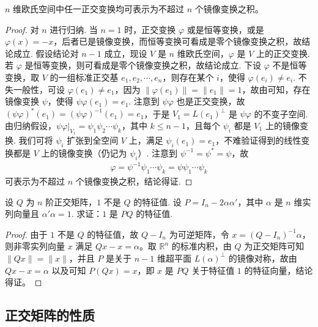 \documentclass[../../main.tex]{subfiles}
\begin{document}
\begin{proposition}\label{proposition:例9.43}
\(n\) 维欧氏空间中任一正交变换均可表示为不超过 \(n\) 个镜像变换之积。
\end{proposition}
\begin{proof}
对 \(n\) 进行归纳. 当 \(n = 1\) 时，正交变换 \(\varphi\) 或是恒等变换，或是 \(\varphi(x) = -x\)，后者已是镜像变换，而恒等变换可看成是零个镜像变换之积，故结论成立. 假设结论对 \(n - 1\) 成立，现设 \(V\) 是 \(n\) 维欧氏空间，\(\varphi\) 是 \(V\) 上的正交变换. 若 \(\varphi\) 是恒等变换，则可看成是零个镜像变换之积，故结论成立. 下设 \(\varphi\) 不是恒等变换，取 \(V\) 的一组标准正交基 \(e_1,e_2,\cdots,e_n\)，则存在某个 \(i\)，使得 \(\varphi(e_i) \neq e_i\). 不失一般性，可设 \(\varphi(e_1) \neq e_1\)，因为 \(\|\varphi(e_1)\| = \|e_1\| = 1\)，故由可知，存在镜像变换 \(\psi\)，使得 \(\psi\varphi(e_1) = e_1\). 注意到 \(\psi\varphi\) 也是正交变换，故 \((\psi\varphi)^*(e_1) = (\psi\varphi)^{-1}(e_1) = e_1\)，于是 \(V_1 = L(e_1)^{\perp}\) 是 \(\psi\varphi\) 的不变子空间. 由归纳假设，\(\psi\varphi|_{V_1} = \psi_1\psi_2\cdots\psi_k\)，其中 \(k \leq n - 1\)，且每个 \(\psi_i\) 都是 \(V_1\) 上的镜像变换. 我们可将 \(\psi_i\) 扩张到全空间 \(V\) 上，满足 \(\psi_i(e_1) = e_1\)，不难验证得到的线性变换都是 \(V\) 上的镜像变换（仍记为 \(\psi_i\)）. 注意到 \(\psi^{-1} = \psi^* = \psi\)，故
\begin{align*}
\varphi = \psi^{-1}\psi_1\cdots\psi_k = \psi\psi_1\cdots\psi_k
\end{align*}
可表示为不超过 \(n\) 个镜像变换之积，结论得证. 
\end{proof}

\begin{proposition}\label{proposition:例9.44}
设 \(Q\) 为 \(n\) 阶正交矩阵，\(1\) 不是 \(Q\) 的特征值. 设 \(P = I_n - 2\alpha\alpha'\)，其中 \(\alpha\) 是 \(n\) 维实列向量且 \(\alpha'\alpha = 1\). 求证：\(1\) 是 \(PQ\) 的特征值.
\end{proposition}
\begin{proof}
由于 \(1\) 不是 \(Q\) 的特征值，故 \(Q - I_n\) 为可逆矩阵，令 \(x = (Q - I_n)^{-1}\alpha\)，则非零实列向量 \(x\) 满足 \(Qx - x = \alpha\)。取 \(\mathbb{R}^n\) 的标准内积，由 \(Q\) 为正交矩阵可知 \(\|Qx\| = \|x\|\)，并且 \(P\) 是关于 \(n - 1\) 维超平面 \(L(\alpha)^{\perp}\) 的镜像对称，故由 \(Qx - x = \alpha\) 以及可知 \(P(Qx) = x\)，即 \(x\) 是 \(PQ\) 关于特征值 \(1\) 的特征向量，结论得证。
\end{proof}


\subsection{正交矩阵的性质}
\end{document}

